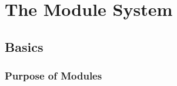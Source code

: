 %
%
%
%
%
\chapter{The Module System}%
\label{modules}%
\label{chapmodules}%

\section{Basics}
\subsection{Purpose of Modules}

